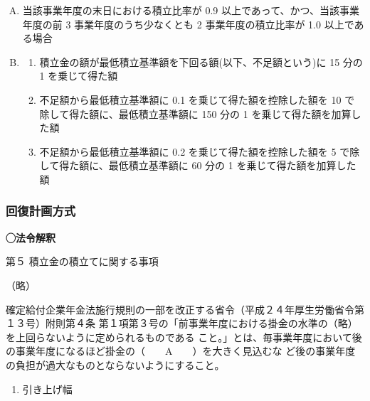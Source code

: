 \begin{answerbox}
  \begin{enumerate}[(A)]
    \item 当該事業年度の末日における積立比率が 0.9 以上であって、かつ、当該事業年度の前 3 事業年度のうち少なくとも 2 事業年度の積立比率が 1.0 以上である場合
    \\
    \item \begin{enumerate}[1. ]
      \item 積立金の額が最低積立基準額を下回る額(以下、不足額という)に 15 分の 1 を乗じて得た額
      \item 不足額から最低積立基準額に 0.1 を乗じて得た額を控除した額を 10 で除して得た額に、最低積立基準額に 150 分の 1 を乗じて得た額を加算した額
      \item 不足額から最低積立基準額に 0.2 を乗じて得た額を控除した額を 5 で除して得た額に、最低積立基準額に 60 分の 1 を乗じて得た額を加算した額
    \end{enumerate}
  \end{enumerate}
\end{answerbox}

\newpage

\subsubsection{回復計画方式}

\begin{fillblank}[数理人試験 2025 問題1 設問1 H]
    \noindent \textbf{◯法令解釈}
  \begin{lawstructure}
    \begin{lawarticle}{}{}
      第５ 積立金の積立てに関する事項

      （略）

      確定給付企業年金法施行規則の一部を改正する省令（平成２４年厚生労働省令第１３号）附則第４条
      第１項第３号の「前事業年度における掛金の水準の（略）を上回らないように定められるものである
      こと。」とは、毎事業年度において後の事業年度になるほど掛金の（　　A　　）を大きく見込むな
      ど後の事業年度の負担が過大なものとならないようにすること。
    \end{lawarticle}
  \end{lawstructure}
\end{fillblank}

\begin{answerbox}
  \begin{enumerate}[A: ]
    \item 引き上げ幅
  \end{enumerate}
\end{answerbox}

